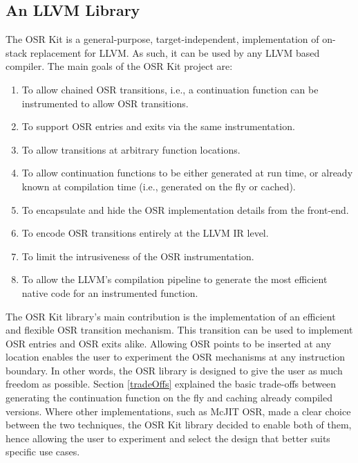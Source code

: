 \subsection{An LLVM Library}

The OSR Kit is a general-purpose, target-independent, implementation of on-stack replacement for LLVM.
As such, it can be used by any LLVM based compiler.
The main goals of the OSR Kit project are:
\begin{enumerate}
    \item To allow chained OSR transitions, i.e., a continuation function can be instrumented to allow OSR transitions.
    \item To support OSR entries and exits via the same instrumentation.
    \item To allow transitions at arbitrary function locations.
    \item To allow continuation functions to be either generated at run time, or already known at compilation time (i.e., generated on the fly or cached).
    \item To encapsulate and hide the OSR implementation details from the front-end.
    \item To encode OSR transitions entirely at the LLVM IR level.
    \item To limit the intrusiveness of the OSR instrumentation.
    \item To allow the LLVM's compilation pipeline to generate the most efficient native code for an instrumented function. \label{llvmTransformPasses}
\end{enumerate}

The OSR Kit library's main contribution is the implementation of an efficient and flexible OSR transition mechanism.
This transition can be used to implement OSR entries and OSR exits alike.
Allowing OSR points to be inserted at any location enables the user to experiment the OSR mechanisms at any instruction boundary. 
In other words, the OSR library is designed to give the user as much freedom as possible.
Section \ref{tradeOffs} explained the basic trade-offs between generating the continuation function on the fly and caching already compiled versions.
Where other implementations, such as McJIT OSR\cite{lameed2013modular}, made a clear choice between the two techniques, the OSR Kit library decided to enable both of them, hence allowing the user to experiment and select the design that better suits specific use cases.\\

